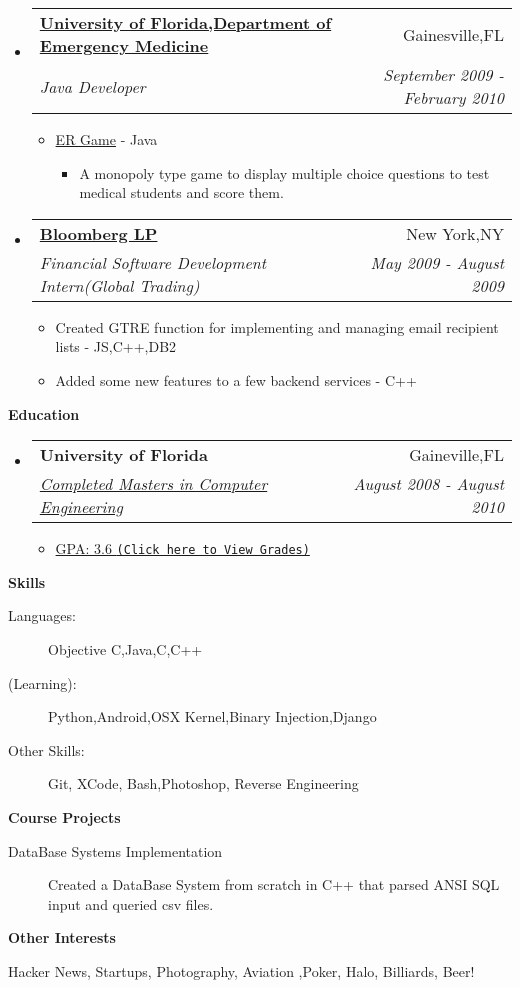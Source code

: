 \documentclass[letterpaper,11pt]{article}
\makeatletter
\newcommand{\resitem}[1]{\item #1 \vspace{-2pt}}
\newcommand{\resheading}[1]{{\large \colorbox{mygrey}{\begin{minipage}{\textwidth}{\textbf{#1 \vphantom{p\^{E}}}}\end{minipage}}}}
\newcommand{\ressubheading}[4]{
\begin{tabular*}{7.0in}{l@{\extracolsep{\fill}}r}
		\textbf{#1} & #2 \\
		\textit{#3} & \textit{#4} \\
\end{tabular*}\vspace{-6pt}}
\makeatother
\begin{document}
\begin{itemize}
\item
    \ressubheading{\href{http://emergency.med.ufl.edu}{University of Florida,Department of Emergency Medicine}}{Gainesville,FL}{Java Developer}{September 2009 - February 2010}
    \begin{itemize}
        \resitem{\href{http://onlinelibrary.wiley.com/doi/10.1111/j.1553-2712.2009.00392_16.x/abstract}{ER Game} - Java}
        \begin{itemize}
            \resitem{A monopoly type game to display multiple choice questions to test medical students and score them.}
        \end{itemize}
    \end{itemize}
                
\item
    \ressubheading{\href{http://www.bloomberg.com}{Bloomberg LP}}{New York,NY}{Financial Software Development Intern(Global Trading)}{May 2009 - August 2009}
    \begin{itemize}
        \resitem{Created GTRE function for implementing and managing email recipient lists - JS,C++,DB2}
        \resitem{Added some new features to a few backend services - C++ }
    \end{itemize}
\end{itemize}

	
\resheading{Education}
\begin{itemize}
\item
    \ressubheading{University of Florida}{Gaineville,FL}{\href{http://dl.dropbox.com/u/23360122/UF_Grades.pdf}{Completed Masters in Computer Engineering}}{August 2008 - August 2010}
    \begin{itemize}
        \resitem{\href{http://dl.dropbox.com/u/23360122/UF_Grades.pdf}{GPA: 3.6 \texttt{(Click here to View Grades)}}}
    \end{itemize}
\end{itemize}

\resheading{Skills}
\begin{description}
\item[Languages:]
Objective C,Java,C,C++
\item[(Learning):]
Python,Android,OSX Kernel,Binary Injection,Django
\item[Other Skills:]
Git, XCode, Bash,Photoshop, Reverse Engineering 
\end{description}

\resheading{Course Projects}
\begin{description}
\item[DataBase Systems Implementation] Created a DataBase System from scratch in C++ that parsed ANSI SQL input and queried csv files.
\end{description}


\resheading{Other Interests}
\begin{description}
\item Hacker News, Startups, Photography, Aviation ,Poker, Halo, Billiards, Beer!
\end{description}
\end{document}
